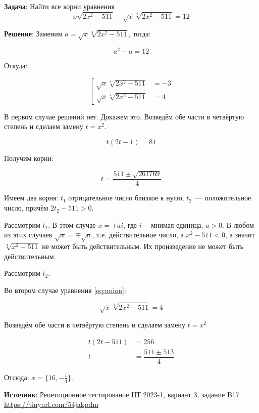 \documentclass{article} %
\begin{document}
\textbf{Задача}: Найти все корни уравнения
\begin{equation}
  x \sqrt{2x^2 - 511} - \sqrt{x} \sqrt[4]{2x^2 - 511} = 12
\end{equation}

\clearpage

\textbf{Решение}: Заменим $a = \sqrt{x} \sqrt[4]{2x^2 - 511}$, тогда:

\begin{equation}
  a^2 - a = 12
\end{equation}

Откуда:

\begin{equation}
  \left[
    \begin{aligned}
      \sqrt{x} \sqrt[4]{2x^2 - 511} & = -3 \\
      \sqrt{x} \sqrt[4]{2x^2 - 511} & = 4
    \end{aligned}
  \right.
  \label{eq:union}
\end{equation}

В первом случае решений нет. Докажем это. Возведём обе части в четвёртую степень и сделаем замену $t = x^2$.

\begin{equation}
  t (2t - 1) = 81
\end{equation}

Получим корни:

\begin{equation}
  t = \dfrac{511 \pm \sqrt{261769}}{4}
\end{equation}

Имеем два корня: $t_1$ отрицательное число близкое к нулю, $t_2$~--- положительное число, причём $2t_2 - 511 > 0$.

Рассмотрим $t_1$. В этом случае $x = \pm ai$, где $i$~-- мнимая единица, $a>0$. В любом из этих случаев $\sqrt{x} = \mp \sqrt{a}$, т.е. действительное число, а $x^2 - 511 < 0$, а значит $\sqrt[4]{x^2 - 511}$ не может быть действительным. Их произведение не может быть действительным.

Рассмотрим $t_2$. 

Во втором случае уравнения \ref{eq:union}:

\begin{equation}
  \sqrt{x} \sqrt[4]{2x^2 - 511} = 4
\end{equation}

Возведём обе части в четвёртую степень и сделаем замену $t = x^2$

\begin{equation}
\begin{aligned}
  t (2t - 511) & = 256 \\
  t & = \dfrac{511 \pm 513}{4} 
\end{aligned}
\end{equation}

Отсюда: $x = \{16, -\frac{i}{4}\}$.

\textbf{Источник}: Репетиционное тестирование ЦТ 2023-1, вариант 3, задание B17 \url{https://tinyurl.com/54jakpdm} 
\end{document}
